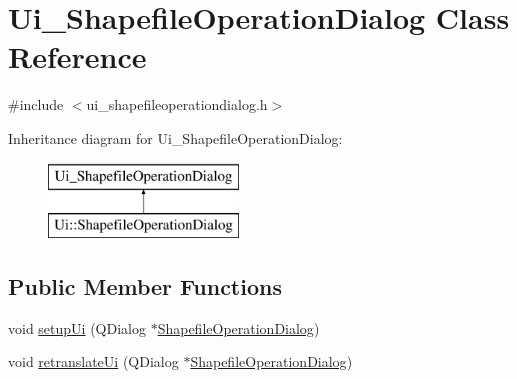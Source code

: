 \hypertarget{class_ui___shapefile_operation_dialog}{}\section{Ui\+\_\+\+Shapefile\+Operation\+Dialog Class Reference}
\label{class_ui___shapefile_operation_dialog}


{\ttfamily \#include $<$ui\+\_\+shapefileoperationdialog.\+h$>$}

Inheritance diagram for Ui\+\_\+\+Shapefile\+Operation\+Dialog\+:\begin{figure}[H]
\begin{center}
\leavevmode
\includegraphics[height=2.000000cm]{dd/d0f/class_ui___shapefile_operation_dialog}
\end{center}
\end{figure}
\subsection*{Public Member Functions}
\begin{DoxyCompactItemize}
\item 
void \mbox{\hyperlink{class_ui___shapefile_operation_dialog_aa2a99a08142c725bc068268866bf13ad}{setup\+Ui}} (Q\+Dialog $\ast$\mbox{\hyperlink{class_shapefile_operation_dialog}{Shapefile\+Operation\+Dialog}})
\item 
void \mbox{\hyperlink{class_ui___shapefile_operation_dialog_a794fd9dbabf602cecb777646ee5c5803}{retranslate\+Ui}} (Q\+Dialog $\ast$\mbox{\hyperlink{class_shapefile_operation_dialog}{Shapefile\+Operation\+Dialog}})
\end{DoxyCompactItemize}
